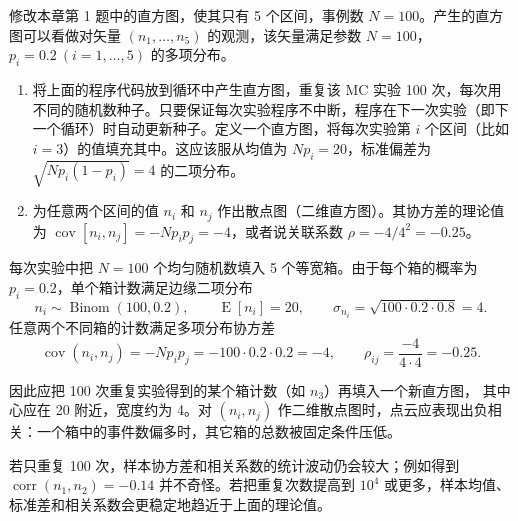\begin{question}
修改本章第 1 题中的直方图，使其只有 5 个区间，事例数
\(N=100\)。产生的直方图可以看做对矢量 \((n_1,\ldots,n_5)\)
的观测，该矢量满足参数 \(N=100\)，\(p_i=0.2\ (i=1,\ldots,5)\)
的多项分布。

\begin{enumerate}
\item
  将上面的程序代码放到循环中产生直方图，重复该 MC 实验 100
  次，每次用不同的随机数种子。只要保证每次实验程序不中断，程序在下一次实验（即下一个循环）时自动更新种子。定义一个直方图，将每次实验第
  \(i\) 个区间（比如 \(i=3\)）的值填充其中。这应该服从均值为
  \(Np_i=20\)，标准偏差为 \(\sqrt{Np_i(1-p_i)}=4\) 的二项分布。
\item
  为任意两个区间的值 \(n_i\) 和 \(n_j\)
  作出散点图（二维直方图）。其协方差的理论值为
  \(\operatorname{cov}[n_i,n_j]=-Np_ip_j=-4\)，或者说关联系数
  \(\rho=-4/4^2=-0.25\)。
\end{enumerate}
\begin{solution}
每次实验中把 \(N=100\) 个均匀随机数填入 5 个等宽箱。由于每个箱的概率为
\(p_i=0.2\)，单个箱计数满足边缘二项分布
\[
n_i\sim\operatorname{Binom}(100,0.2),
\qquad
\operatorname{E}[n_i]=20,
\qquad
\sigma_{n_i}=\sqrt{100\cdot0.2\cdot0.8}=4.
\]
任意两个不同箱的计数满足多项分布协方差
\[
\operatorname{cov}(n_i,n_j)=-Np_ip_j=-100\cdot0.2\cdot0.2=-4,
\qquad
\rho_{ij}=\frac{-4}{4\cdot4}=-0.25.
\]

因此应把 100 次重复实验得到的某个箱计数（如 \(n_3\)）再填入一个新直方图，
其中心应在 20 附近，宽度约为 4。对 \((n_i,n_j)\) 作二维散点图时，点云应表现出负相关：一个箱中的事件数偏多时，其它箱的总数被固定条件压低。

若只重复 100 次，样本协方差和相关系数的统计波动仍会较大；例如得到
\(\operatorname{corr}(n_1,n_2)=-0.14\) 并不奇怪。若把重复次数提高到
\(10^4\) 或更多，样本均值、标准差和相关系数会更稳定地趋近于上面的理论值。
\end{solution}
\end{question}


